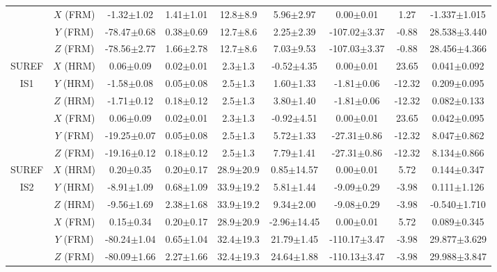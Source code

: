 \begin{table}
\begin{center}
\begin{tabular}{cc|cccc||cc||c}
 & $X$ (FRM) & -1.32$\pm$1.02& 1.41$\pm$1.01 & 12.8$\pm$8.9 & 5.96$\pm$2.97 & 0.00$\pm$0.01 & 1.27 & -1.337$\pm$1.015 \\
 & $Y$ (FRM) & -78.47$\pm$0.68& 0.38$\pm$0.69 & 12.7$\pm$8.6 & 2.25$\pm$2.39 & -107.02$\pm$3.37 & -0.88 & 28.538$\pm$3.440 \\
 & $Z$ (FRM) & -78.56$\pm$2.77& 1.66$\pm$2.78 & 12.7$\pm$8.6 & 7.03$\pm$9.53 & -107.03$\pm$3.37 & -0.88 & 28.456$\pm$4.366 \\
\hline
\hline
SUREF & $X$ (HRM) & 0.06$\pm$0.09& 0.02$\pm$0.01 & 2.3$\pm$1.3 & -0.52$\pm$4.35 & 0.00$\pm$0.01 & 23.65 & 0.041$\pm$0.092 \\
IS1 & $Y$ (HRM) & -1.58$\pm$0.08& 0.05$\pm$0.08 & 2.5$\pm$1.3 & 1.60$\pm$1.33 & -1.81$\pm$0.06 & -12.32 & 0.209$\pm$0.095 \\
 & $Z$ (HRM) & -1.71$\pm$0.12& 0.18$\pm$0.12 & 2.5$\pm$1.3 & 3.80$\pm$1.40 & -1.81$\pm$0.06 & -12.32 & 0.082$\pm$0.133 \\
 & $X$ (FRM) & 0.06$\pm$0.09& 0.02$\pm$0.01 & 2.3$\pm$1.3 & -0.92$\pm$4.51 & 0.00$\pm$0.01 & 23.65 & 0.042$\pm$0.095 \\
 & $Y$ (FRM) & -19.25$\pm$0.07& 0.05$\pm$0.08 & 2.5$\pm$1.3 & 5.72$\pm$1.33 & -27.31$\pm$0.86 & -12.32 & 8.047$\pm$0.862 \\
 & $Z$ (FRM) & -19.16$\pm$0.12& 0.18$\pm$0.12 & 2.5$\pm$1.3 & 7.79$\pm$1.41 & -27.31$\pm$0.86 & -12.32 & 8.134$\pm$0.866 \\
\hline
SUREF & $X$ (HRM) & 0.20$\pm$0.35& 0.20$\pm$0.17 & 28.9$\pm$20.9 & 0.85$\pm$14.57 & 0.00$\pm$0.01 & 5.72 & 0.144$\pm$0.347 \\
IS2 & $Y$ (HRM) & -8.91$\pm$1.09& 0.68$\pm$1.09 & 33.9$\pm$19.2 & 5.81$\pm$1.44 & -9.09$\pm$0.29 & -3.98 & 0.111$\pm$1.126 \\
 & $Z$ (HRM) & -9.56$\pm$1.69& 2.38$\pm$1.68 & 33.9$\pm$19.2 & 9.34$\pm$2.00 & -9.08$\pm$0.29 & -3.98 & -0.540$\pm$1.710 \\
 & $X$ (FRM) & 0.15$\pm$0.34& 0.20$\pm$0.17 & 28.9$\pm$20.9 & -2.96$\pm$14.45 & 0.00$\pm$0.01 & 5.72 & 0.089$\pm$0.345 \\
 & $Y$ (FRM) & -80.24$\pm$1.04& 0.65$\pm$1.04 & 32.4$\pm$19.3 & 21.79$\pm$1.45 & -110.17$\pm$3.47 & -3.98 & 29.877$\pm$3.629 \\
 & $Z$ (FRM) & -80.09$\pm$1.66& 2.27$\pm$1.66 & 32.4$\pm$19.3 & 24.64$\pm$1.88 & -110.13$\pm$3.47 & -3.98 & 29.988$\pm$3.847 \\
\hline
\hline
\end{tabular}
\end{center}\label{tab_results}
\label{default}
\end{table}%
